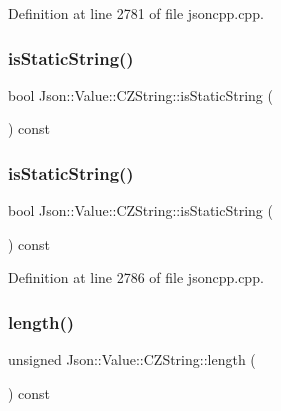 Definition at line 2781 of file jsoncpp.\+cpp.

\hypertarget{class_json_1_1_value_1_1_c_z_string_a5991dfa2f6c2ba318373c7429fcd7a57}{}\label{class_json_1_1_value_1_1_c_z_string_a5991dfa2f6c2ba318373c7429fcd7a57} 
\subsubsection{\texorpdfstring{is\+Static\+String()}{isStaticString()}\hspace{0.1cm}{\footnotesize\ttfamily [1/2]}}
{\footnotesize\ttfamily bool Json\+::\+Value\+::\+C\+Z\+String\+::is\+Static\+String (\begin{DoxyParamCaption}{ }\end{DoxyParamCaption}) const}

\hypertarget{class_json_1_1_value_1_1_c_z_string_a5991dfa2f6c2ba318373c7429fcd7a57}{}\label{class_json_1_1_value_1_1_c_z_string_a5991dfa2f6c2ba318373c7429fcd7a57} 
\subsubsection{\texorpdfstring{is\+Static\+String()}{isStaticString()}\hspace{0.1cm}{\footnotesize\ttfamily [2/2]}}
{\footnotesize\ttfamily bool Json\+::\+Value\+::\+C\+Z\+String\+::is\+Static\+String (\begin{DoxyParamCaption}{ }\end{DoxyParamCaption}) const}



Definition at line 2786 of file jsoncpp.\+cpp.

\hypertarget{class_json_1_1_value_1_1_c_z_string_aa7ee665d162c1f33b3ec818e289d8a5e}{}\label{class_json_1_1_value_1_1_c_z_string_aa7ee665d162c1f33b3ec818e289d8a5e} 
\subsubsection{\texorpdfstring{length()}{length()}\hspace{0.1cm}{\footnotesize\ttfamily [1/2]}}
{\footnotesize\ttfamily unsigned Json\+::\+Value\+::\+C\+Z\+String\+::length (\begin{DoxyParamCaption}{ }\end{DoxyParamCaption}) const}

